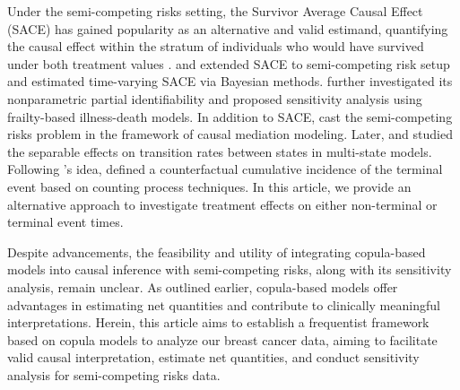 \documentclass[12pt]{article}
\theoremstyle{plain}
\begin{document}
Under the semi-competing risks setting, the Survivor Average Causal Effect (SACE) has gained popularity as an alternative and valid estimand, quantifying the causal effect within the stratum of individuals who would have survived under both treatment values \citep{frangakis2002principal}. \cite{comment2019survivor} and \cite{xu2022bayesian} extended SACE to semi-competing risk setup and estimated time-varying SACE via Bayesian methods. \cite{Nevo2022semicompeting} further investigated its nonparametric partial identifiability and proposed sensitivity analysis using frailty-based illness-death models. In addition to SACE, \cite{huang2021causal} cast the semi-competing risks problem in the framework of causal mediation modeling. Later, \cite{deng2023separable} and \cite{breum2024} studied the separable effects on transition rates between states in multi-state models. Following \cite{huang2021causal}'s idea, \cite{deng2024direct} defined a counterfactual cumulative incidence of the terminal event based on counting process techniques. In this article, we provide an alternative approach to investigate treatment effects on either non-terminal or terminal event times.

Despite advancements, the feasibility and utility of integrating copula-based models into causal inference with semi-competing risks, along with its sensitivity analysis, remain unclear. As outlined earlier, copula-based models offer advantages in estimating net quantities and contribute to clinically meaningful interpretations. Herein, this article aims to establish a frequentist framework based on copula models to analyze our breast cancer data, aiming to facilitate valid causal interpretation, estimate net quantities, and conduct sensitivity analysis for semi-competing risks data.  



\end{document}
